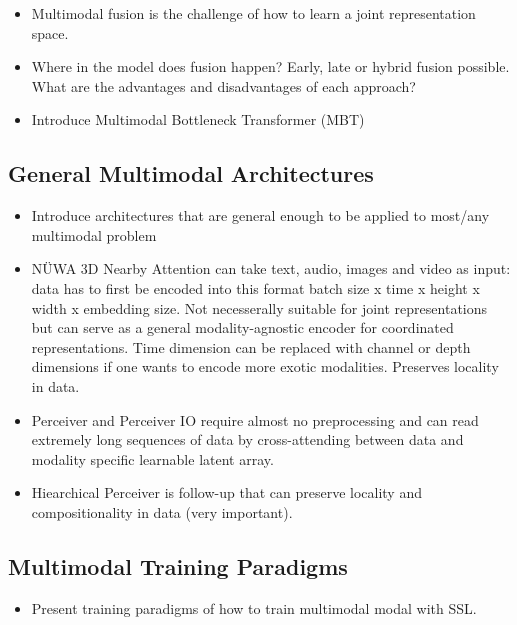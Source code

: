 \documentclass[
]{krantz}
\providecommand{\tightlist}{%
  \setlength{\itemsep}{0pt}\setlength{\parskip}{0pt}}
\begin{document}
\begin{itemize}
\tightlist
\item
  Multimodal fusion is the challenge of how to learn a joint representation space.
\item
  Where in the model does fusion happen? Early, late or hybrid fusion possible. What are the advantages and disadvantages of each approach?
\item
  Introduce Multimodal Bottleneck Transformer (MBT)
\end{itemize}

\hypertarget{general-multimodal-architectures}{%
\subsection{General Multimodal Architectures}\label{general-multimodal-architectures}}

\begin{itemize}
\tightlist
\item
  Introduce architectures that are general enough to be applied to most/any multimodal problem
\item
  NÜWA 3D Nearby Attention can take text, audio, images and video as input: data has to first be encoded into this format batch size x time x height x width x embedding size. Not necesserally suitable for joint representations but can serve as a general modality-agnostic encoder for coordinated representations. Time dimension can be replaced with channel or depth dimensions if one wants to encode more exotic modalities. Preserves locality in data.
\item
  Perceiver and Perceiver IO require almost no preprocessing and can read extremely long sequences of data by cross-attending between data and modality specific learnable latent array.
\item
  Hiearchical Perceiver is follow-up that can preserve locality and compositionality in data (very important).
\end{itemize}

\hypertarget{multimodal-training-paradigms}{%
\subsection{Multimodal Training Paradigms}\label{multimodal-training-paradigms}}

\begin{itemize}
\tightlist
\item
  Present training paradigms of how to train multimodal modal with SSL.
\end{itemize}
\end{document}
